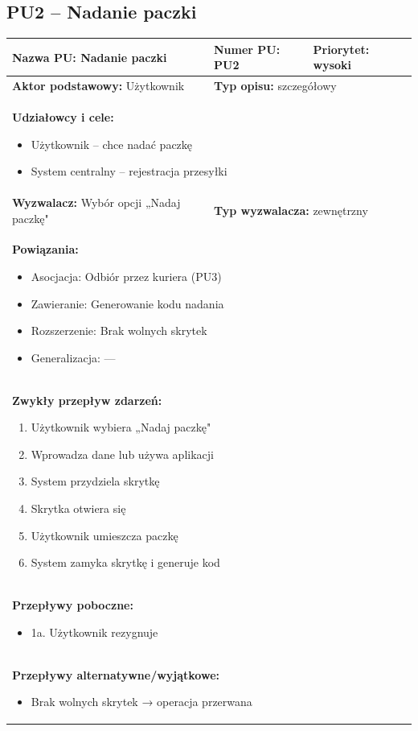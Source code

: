 \documentclass[a4paper,12pt]{article}
\begin{document}
\vspace{1cm}

\subsection{PU2 – Nadanie paczki}

\begin{tabular}{|p{6cm}|p{4cm}|p{5cm}|}
\hline
\textbf{Nazwa PU:} Nadanie paczki &
\textbf{Numer PU:} PU2 &
\textbf{Priorytet:} wysoki \\
\hline
\textbf{Aktor podstawowy:} Użytkownik &
\multicolumn{2}{p{9cm}|}{\textbf{Typ opisu:} szczegółowy} \\
\hline
\multicolumn{3}{|p{15cm}|}{
\textbf{Udziałowcy i cele:}
\begin{itemize}
\item Użytkownik – chce nadać paczkę
\item System centralny – rejestracja przesyłki
\end{itemize}
} \\
\hline
\textbf{Wyzwalacz:} Wybór opcji „Nadaj paczkę" &
\multicolumn{2}{p{9cm}|}{\textbf{Typ wyzwalacza:} zewnętrzny} \\
\hline
\multicolumn{3}{|p{15cm}|}{
\textbf{Powiązania:}
\begin{itemize}
\item Asocjacja: Odbiór przez kuriera (PU3)
\item Zawieranie: Generowanie kodu nadania
\item Rozszerzenie: Brak wolnych skrytek
\item Generalizacja: —
\end{itemize}
} \\
\hline
\multicolumn{3}{|p{15cm}|}{
\textbf{Zwykły przepływ zdarzeń:}
\begin{enumerate}
\item Użytkownik wybiera „Nadaj paczkę"
\item Wprowadza dane lub używa aplikacji
\item System przydziela skrytkę
\item Skrytka otwiera się
\item Użytkownik umieszcza paczkę
\item System zamyka skrytkę i generuje kod
\end{enumerate}
} \\
\hline
\multicolumn{3}{|p{15cm}|}{
\textbf{Przepływy poboczne:}
\begin{itemize}
\item 1a. Użytkownik rezygnuje
\end{itemize}
} \\
\hline
\multicolumn{3}{|p{15cm}|}{
\textbf{Przepływy alternatywne/wyjątkowe:}
\begin{itemize}
\item Brak wolnych skrytek → operacja przerwana
\end{itemize}
} \\
\hline
\end{tabular}
\end{document}
